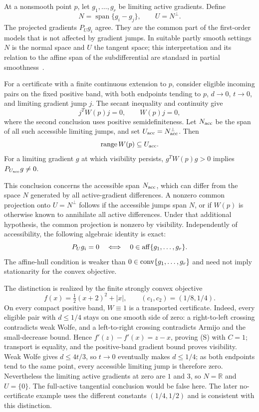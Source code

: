 At a nonsmooth point $p$, let $g_1,\dots,g_r$ be limiting active gradients. Define
\[
 N=\operatorname{span}\{g_i-g_j\},\qquad U=N^\perp.
\]
The projected gradients $P_Ug_i$ agree. They are the common part of the first-order models that is not affected by gradient jumps. In suitable partly smooth settings $N$ is the normal space and $U$ the tangent space; this interpretation and its relation to the affine span of the subdifferential are standard in partial smoothness~\cite{LL}.

For a certificate with a finite continuous extension to $p$, consider eligible incoming pairs on the fixed positive band, with both endpoints tending to $p$, $d\to0$, $t\to0$, and limiting gradient jump $j$. The secant inequality and continuity give
\[
 j^TW(p)j=0,\qquad W(p)j=0,
\]
where the second conclusion uses positive semidefiniteness. Let $N_{\rm acc}$ be the span of all such accessible limiting jumps, and set $U_{\rm acc}=N_{\rm acc}^{\perp}$. Then
\[
 \operatorname{range}W(p)\subseteq U_{\rm acc}.
\]
For a limiting gradient $g$ at which visibility persists, $g^TW(p)g>0$ implies $P_{U_{\rm acc}}g\ne0$.

This conclusion concerns the accessible span $N_{\rm acc}$, which can differ from the space $N$ generated by all active-gradient differences. A nonzero common projection onto $U=N^\perp$ follows if the accessible jumps span $N$, or if $W(p)$ is otherwise known to annihilate all active differences. Under that additional hypothesis, the common projection is nonzero by visibility. Independently of accessibility, the following algebraic identity is exact:
\[
 P_Ug_i=0\quad\Longleftrightarrow\quad0\in\operatorname{aff}\{g_1,\dots,g_r\}.
\]
The affine-hull condition is weaker than $0\in\operatorname{conv}\{g_1,\dots,g_r\}$ and need not imply stationarity for the convex objective.

The distinction is realized by the finite strongly convex objective
\[
 f(x)=\tfrac12(x+2)^2+|x|,
 \qquad (c_1,c_2)=(1/8,1/4).
\]
On every compact positive band, $W\equiv1$ is a transported certificate. Indeed, every eligible pair with $d\le1/4$ stays on one smooth side of zero: a right-to-left crossing contradicts weak Wolfe, and a left-to-right crossing contradicts Armijo and the small-decrease bound. Hence $f'(z)-f'(x)=z-x$, proving (S) with $C=1$; transport is equality, and the positive-band gradient bound proves visibility. Weak Wolfe gives $d\le4t/3$, so $t\to0$ eventually makes $d\le1/4$; as both endpoints tend to the same point, every accessible limiting jump is therefore zero. Nevertheless the limiting active gradients at zero are $1$ and $3$, so $N=\mathbb R$ and $U=\{0\}$. The full-active tangential conclusion would be false here. The later no-certificate example uses the different constants $(1/4,1/2)$ and is consistent with this distinction.

